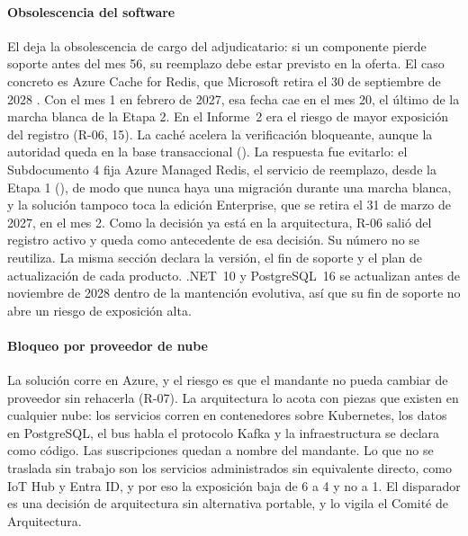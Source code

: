 \paragraph{Obsolescencia del software}
El  deja la obsolescencia de cargo del adjudicatario: si un componente pierde
soporte antes del mes 56, su reemplazo debe estar previsto en la oferta. El caso concreto es Azure Cache
for Redis, que Microsoft retira el 30 de septiembre de 2028 \parencite{ms_redis_retiro}. Con el mes 1 en
febrero de 2027, esa fecha cae en el mes 20, el último de la marcha blanca de la Etapa 2. En el Informe~2
era el riesgo de mayor exposición del registro (R-06, 15). La caché acelera la verificación bloqueante,
aunque la autoridad queda en la base transaccional (). La respuesta fue
evitarlo: el Subdocumento 4 fija Azure Managed Redis, el servicio de reemplazo, desde la Etapa 1
(), de modo que nunca haya una migración durante una marcha blanca, y la
solución tampoco toca la edición Enterprise, que se retira el 31 de marzo de 2027, en el mes 2. Como la
decisión ya está en la arquitectura, R-06 salió del registro activo y queda como antecedente de esa
decisión. Su número no se reutiliza. La misma sección declara la versión, el fin de soporte y el
plan de actualización de cada producto. .NET~10 y PostgreSQL~16 se actualizan antes de noviembre de 2028
dentro de la mantención evolutiva, así que su fin de soporte no abre un riesgo de exposición alta.

\paragraph{Bloqueo por proveedor de nube}
La solución corre en Azure, y el riesgo es que el mandante no pueda cambiar de proveedor sin rehacerla
(R-07). La arquitectura lo acota con piezas que existen en cualquier nube: los servicios corren en
contenedores sobre Kubernetes, los datos en PostgreSQL, el bus habla el protocolo Kafka y la
infraestructura se declara como código. Las suscripciones quedan a nombre del mandante. Lo que no se
traslada sin trabajo son los servicios administrados sin equivalente directo, como IoT Hub y Entra ID,
y por eso la exposición baja de 6 a 4 y no a 1. El disparador es una decisión de arquitectura sin
alternativa portable, y lo vigila el Comité de Arquitectura.

